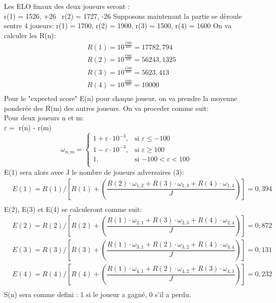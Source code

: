 \documentclass[11pt]{article}
\theoremstyle{definition}
\begin{document}
    Les ELO finaux des deux joueurs seront : \\

        r(1) = 1526, +26 \ r(2) = 1727, -26
    \newpage
    Supposons maintenant la partie se dèroule sentre 4 joueurs:
    r(1) = 1700, r(2) = 1900, r(3) = 1500, r(4) = 1600
    On va calculer les R(n):
        \begin{equation}
            \begin{split}
                & R(1) = 10 ^{\frac{1700}{400}} = 17782,794 \\
                & R(2) = 10^{\frac{1900}{400}} = 56243,1325 \\
                & R(3) = 10^{\frac{1500}{400}} = 5623, 413  \\
                & R(4) = 10^{\frac{1600}{400}} = 10000 \\
            \end{split}
        \end{equation}
        Pour le "expected score" E(n) pour chaque joueur, on va prendre la moyenne ponderée des R(m) des autres joueurs.
        On va proceder comme suit: \\
        Pour deux joueurs n et m: \\
        $\varepsilon = $ r(n) - r(m) 
            $$ \omega_{n, m} =
            \begin{cases}
                1 + \varepsilon \cdot 10^{-3}, & \text{si $\varepsilon \le -100$} \\
                1 - \varepsilon \cdot 10^{-3}, & \text{si $\varepsilon \ge 100$} \\
                1, & \text{si $-100 < \varepsilon < 100$ }\\
            \end{cases} $$
        E(1) sera alors avec J le nombre de joueurs adversaires (3): 
        \begin{equation}
            \begin{split}
                & E(1) = R(1) / [R(1) + (\dfrac{R(2) \cdot \omega_{1, 2} + R(3) \cdot \omega_{1, 3} + R(4) \cdot \omega_{1, 4}}{J})] = 0,394 \\
            \end{split}
        \end{equation}
        E(2), E(3) et E(4) se calculeront comme suit:
        \begin{equation}
            \begin{split}
                & E(2) = R(2) / [R(2) + (\dfrac{R(1) \cdot \omega_{2, 1} + R(3) \cdot \omega_{2, 3} + R(4) \cdot \omega_{2,4} }{J})] = 0,872 \\
                & E(3) = R(3) / [R(3) + (\dfrac{R(1) \cdot \omega_{3, 1} + R(2) \cdot \omega_{3, 2} + R(4) \cdot \omega_{3,4} }{J})] = 0,131 \\
                & E(4) = R(4) / [R(4) + (\dfrac{R(1) \cdot \omega_{4, 1} + R(2) \cdot \omega_{4, 2} + R(3) \cdot \omega_{4,3} }{J})] = 0,232 \\
            \end{split}
        \end{equation}
        S(n) sera comme defini : 1 si le joueur a gagné, 0 s'il a perdu. \\
        
\end{document}
